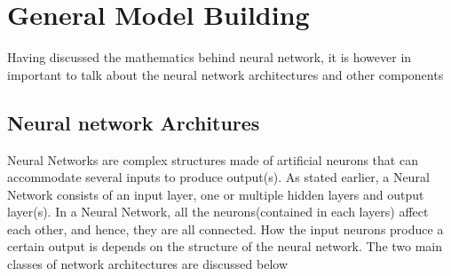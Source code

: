 \documentclass[a4paper,11pt,oneside]{book}
\begin{document}
 \section{General Model Building}
 Having discussed the mathematics behind neural network, it is however in important to talk about the neural network architectures and other components
 \subsection{Neural network Architures}
 Neural Networks are complex structures made of artificial neurons that can accommodate several inputs to produce output(s). As stated earlier, a Neural Network consists of an input layer, one or multiple hidden layers and output layer(s). In a Neural Network, all the neurons(contained in each layers) affect each other, and hence, they are all connected. How the input neurons produce a certain output is depends
 on the structure of the neural network. The two main classes of network architectures are discussed below
\end{document}
